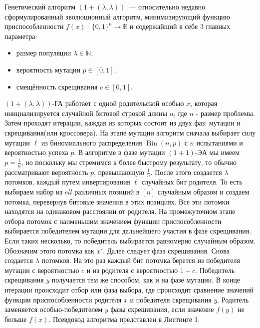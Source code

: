 \documentclass[times]{itmo-student-thesis}
\newcommand{\alglambda}{${(1 + (\lambda , \lambda))}$\xspace}
\newcommand{\alglambdaf}{${(1 + (\lambda , \lambda))}$-ГА\xspace}
\newcommand{\oea}{\mbox{$(1 + 1)$-ЭА}\xspace}
\newcommand{\N}{{\mathbb N}}
\newcommand{\R}{{\mathbb R}}
\DeclareMathOperator{\Bin}{Bin}
\begin{document}
Генетический алгоритм \alglambda~--- относительно недавно сформулированный эволюционный алгоритм, минимизирующий функцию приспособленности $f(x)~:~\{0, 1\}^n \rightarrow \R$ и содержайщий в себе 3 главных параметра:
\begin{itemize}
   \item размер популяции $\lambda \in \N$;
   \item вероятность мутации $p \in [0, 1]$;
   \item смещённость скрещивания $c \in [0, 1]$.
\end{itemize}
\alglambdaf работает с одной родительской особью $x$, которая инициализируется случайной битовой строкой длины $n$, где $n$ - размер проблемы. Затем проходят итерации, каждая из которых состоит из двух фаз: мутации и скрещивания(или кроссовера). На этапе мутации алгоритм сначала выбирает силу мутации $\ell$ из биномиального распределения $\Bin(n, p)$ с $n$ испытаниями и вероятностью успеха $p$. В алгоритме в фазе мутации \oea мы имеем $p = \frac{1}{n}$, но поскольку мы стремимся к более быстрому результату, то обычно рассматривают вероятность $p$, превышающую $\frac{1}{n}$.
После этого создается $\lambda$ потомков, каждый путем инвертирования $\ell$ случайных бит родителя. То есть выбираем набор из $ell$ различных позиций в $[n]$ случайным образом и создаем потомка, перевернув битовые значения в этих позициях.
Все эти потомки находятся на одинаковом расстоянии от родителя.
На промежуточном этапе отбора потомок с наименьшим значением функции приспособленности выбирается победителем мутации для дальнейшего участия в фазе скрещивания. Если таких несколько, то победитель выбирается равномерно случайным образом.
Обозначим этого потомка как $x'$.
Далее следует фаза скрещивания. Снова создается $\lambda$ потомков. На это раз каждый бит потомка берется из победителя мутации с вероятностью $c$ и из родителя с вероятностью $1 - c$. Победитель скрещивания $y$ получается тем же способом, как и на фазе мутации. В конце итерации происходит отбор или фаза выбора, где происходит сравнение значений функции приспособленности родителя $x$ и победителя скрещивания $y$.
Родитель заменяется особью-победителем $y$ фазы скрещивания, если значение $f(y)$ не больше $f(x)$. Псевдокод алгоритма представлен в Листинге 1.
\end{document}
